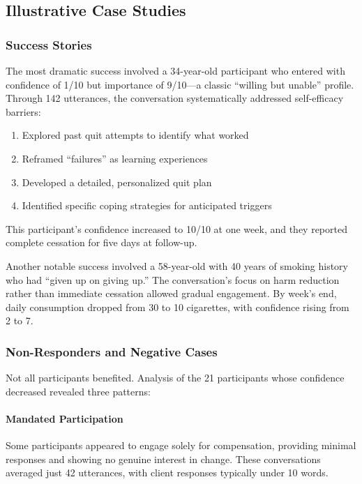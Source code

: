 \subsection{Illustrative Case Studies}
\label{sec:case-studies}

\subsubsection{Success Stories}

The most dramatic success involved a 34-year-old participant who entered with confidence of 1/10 but importance of 9/10---a classic ``willing but unable'' profile. Through 142 utterances, the conversation systematically addressed self-efficacy barriers:

\begin{enumerate}
\item Explored past quit attempts to identify what worked
\item Reframed ``failures'' as learning experiences
\item Developed a detailed, personalized quit plan
\item Identified specific coping strategies for anticipated triggers
\end{enumerate}

This participant's confidence increased to 10/10 at one week, and they reported complete cessation for five days at follow-up.

Another notable success involved a 58-year-old with 40 years of smoking history who had ``given up on giving up.'' The conversation's focus on harm reduction rather than immediate cessation allowed gradual engagement. By week's end, daily consumption dropped from 30 to 10 cigarettes, with confidence rising from 2 to 7.

\subsubsection{Non-Responders and Negative Cases}

Not all participants benefited. Analysis of the 21 participants whose confidence decreased revealed three patterns:

\paragraph{Mandated Participation}
Some participants appeared to engage solely for compensation, providing minimal responses and showing no genuine interest in change. These conversations averaged just 42 utterances, with client responses typically under 10 words.


